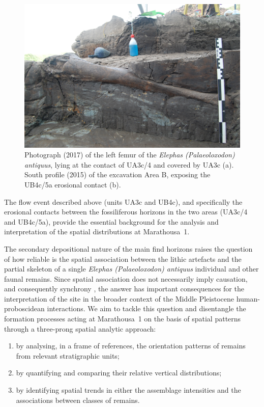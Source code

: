 \documentclass[preprint,authoryear,times]{elsarticle} %
\begin{document}
\begin{figure}[]
  \centering
  \includegraphics[width=1\textwidth]{../artwork/Fig4.jpg}
  \caption{Photograph (2017) of the left femur of the \emph{Elephas (Palaeoloxodon) antiquus}, lying at the contact of UA3c/4 and covered by UA3c (a). South profile (2015) of the excavation Area B, exposing the UB4c/5a erosional contact (b).}
  \label{fig:4}
\end{figure}

The flow event described above (units UA3c and UB4c), and specifically the erosional contacts between the fossiliferous horizons in the two areas (UA3c/4 and UB4c/5a), provide the essential background for the analysis and interpretation of the spatial distributions at Marathousa~1.

The secondary depositional nature of the main find horizons raises the question of how reliable is the spatial association between the lithic artefacts and the partial skeleton of a single \emph{Elephas (Palaeoloxodon) antiquus} individual and other faunal remains. Since spatial association does not necessarily imply causation, and consequently synchrony \citep{Binford1981a,Binford1987}, the answer has important consequences for the interpretation of the site in the broader context of the Middle Pleistocene human-proboscidean interactions. We aim to tackle this question and disentangle the formation processes acting at Marathousa~1 on the basis of spatial patterns through a three-prong spatial analytic approach:
\begin{enumerate}
\item by analysing, in a frame of references, the orientation patterns of remains from relevant stratigraphic units;
\item by quantifying and comparing their relative vertical distributions;
\item by identifying spatial trends in either the assemblage intensities and the associations between classes of remains.
\end{enumerate}
\end{document}
